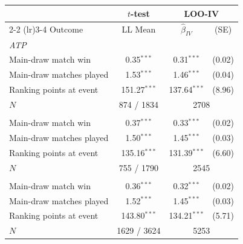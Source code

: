 \begin{tabular}{l ccc}
\toprule
 & $t$-test & \multicolumn{2}{c}{LOO-IV} \\
\cmidrule(lr){2-2} \cmidrule(lr){3-4}
Outcome & LL Mean & $\hat{\beta}_{IV}$ & (SE) \\
\midrule
\multicolumn{5}{l}{\textit{ATP}} \\
\quad Main-draw match win & 0.35$^{***}$ & 0.31$^{***}$ & (0.02) \\
\quad Main-draw matches played & 1.53$^{***}$ & 1.46$^{***}$ & (0.04) \\
\quad Ranking points at event & 151.27$^{***}$ & 137.64$^{***}$ & (8.96) \\
\quad $N$ & \multicolumn{1}{c}{874 / 1834} & \multicolumn{2}{c}{2708} \\
\addlinespace
\multicolumn{5}{l}{\textit{WTA}} \\
\quad Main-draw match win & 0.37$^{***}$ & 0.33$^{***}$ & (0.02) \\
\quad Main-draw matches played & 1.50$^{***}$ & 1.45$^{***}$ & (0.03) \\
\quad Ranking points at event & 135.16$^{***}$ & 131.39$^{***}$ & (6.60) \\
\quad $N$ & \multicolumn{1}{c}{755 / 1790} & \multicolumn{2}{c}{2545} \\
\addlinespace
\multicolumn{5}{l}{\textit{Pooled}} \\
\quad Main-draw match win & 0.36$^{***}$ & 0.32$^{***}$ & (0.02) \\
\quad Main-draw matches played & 1.52$^{***}$ & 1.45$^{***}$ & (0.03) \\
\quad Ranking points at event & 143.80$^{***}$ & 134.21$^{***}$ & (5.71) \\
\quad $N$ & \multicolumn{1}{c}{1629 / 3624} & \multicolumn{2}{c}{5253} \\
\bottomrule
\end{tabular}
